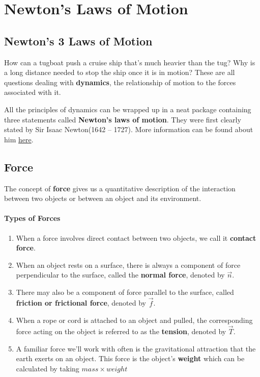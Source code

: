 \section{Newton's Laws of Motion}
\subsection{Newton's 3 Laws of Motion}
How can a tugboat push a cruise ship that's much heavier than the tug? Why is a long distance needed to stop the ship once it is in motion? These are all questions dealing with \textbf{dynamics}, the relationship of motion to the forces associated with it.

All the principles of dynamics can be wrapped up in a neat package containing three statements called \textbf{Newton's laws of motion}. They were first clearly stated by Sir Isaac Newton(1642 -- 1727). More information can be found about him \href{http://www.newton.ac.uk/newtlife.html}{here}.

\subsection{Force}
The concept of \textbf{force} gives us a quantitative description of the interaction between two objects or between an object and its environment.

\paragraph*{Types of Forces} \label{tension}
\begin{enumerate}
\item When a force involves direct contact between two objects, we call it \textbf{contact force}.
\item When an object rests on a surface, there is always a component of force perpendicular to the surface, called the \textbf{normal force}, denoted by $\vec{n}$.
\item There may also be a component of force parallel to the surface, called \textbf{friction or frictional force}, denoted by $\vec{f}$.
\item When a rope or cord is attached to an object and pulled, the corresponding force acting on the object is referred to as the \textbf{tension}, denoted by $\vec{T}$.
\item A familiar force we'll work with often is the gravitational attraction that the earth exerts on an object. This force is the object's \textbf{weight} which can be calculated by taking $mass \times weight$
\end{enumerate}

